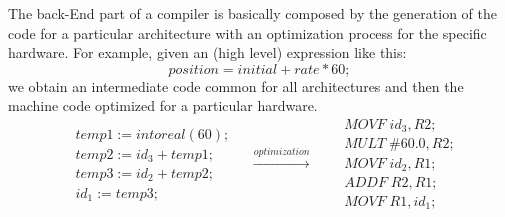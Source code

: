 The back-End part of a compiler is basically composed by the generation of the code for a particular architecture with an optimization process for the specific hardware.
\newline
For example, given an (high level) expression like this:
\[
position = initial + rate * 60;
\]
we obtain an intermediate code common for all architectures and then the machine code optimized for a particular hardware.
\[
\left.
\begin{aligned}
&temp1	:=	intoreal(60);\\
&temp2	:=	id_3 + temp1;\\
&temp3	:=	id_2 + temp2;\\
&id_1	:=	temp3;
\end{aligned}
\quad
\xrightarrow{\textit{optimization}}
\quad
\begin{aligned}
&MOVF\;id_3, R2;\\
&MULT\;\#60.0, R2;\\
&MOVF\;id_2, R1;\\
&ADDF\;R2, R1;\\
&MOVF\;R1, id_1;
\end{aligned}
\right.
\]






